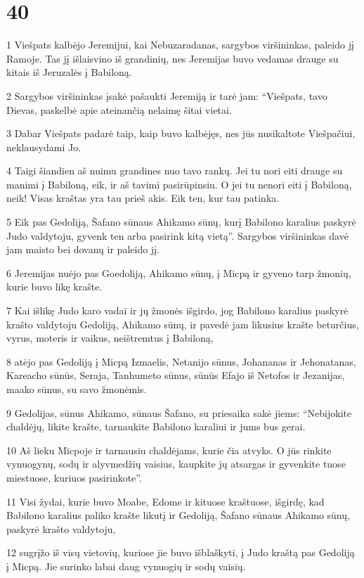 \chapter{40}


\par 1 Viešpats kalbėjo Jeremijui, kai Nebuzaradanas, sargybos viršininkas, paleido jį Ramoje. Tas jį išlaisvino iš grandinių, nes Jeremijas buvo vedamas drauge su kitais iš Jeruzalės į Babiloną. 
\par 2 Sargybos viršininkas įsakė pašaukti Jeremiją ir tarė jam: “Viešpats, tavo Dievas, paskelbė apie ateinančią nelaimę šitai vietai. 
\par 3 Dabar Viešpats padarė taip, kaip buvo kalbėjęs, nes jūs nusikaltote Viešpačiui, neklausydami Jo. 
\par 4 Taigi šiandien aš nuimu grandines nuo tavo rankų. Jei tu nori eiti drauge su manimi į Babiloną, eik, ir aš tavimi pasirūpinsiu. O jei tu nenori eiti į Babiloną, neik! Visas kraštas yra tau prieš akis. Eik ten, kur tau patinka. 
\par 5 Eik pas Gedoliją, Šafano sūnaus Ahikamo sūnų, kurį Babilono karalius paskyrė Judo valdytoju, gyvenk ten arba pasirink kitą vietą”. Sargybos viršininkas davė jam maisto bei dovanų ir paleido jį. 
\par 6 Jeremijas nuėjo pas Goedoliją, Ahikamo sūnų, į Micpą ir gyveno tarp žmonių, kurie buvo likę krašte. 
\par 7 Kai išlikę Judo karo vadai ir jų žmonės išgirdo, jog Babilono karalius paskyrė krašto valdytoju Gedoliją, Ahikamo sūnų, ir pavedė jam likusius krašte beturčius, vyrus, moteris ir vaikus, neištremtus į Babiloną, 
\par 8 atėjo pas Gedoliją į Micpą Izmaelis, Netanijo sūnus, Johananas ir Jehonatanas, Kareacho sūnūs, Seraja, Tanhumeto sūnus, sūnūs Efajo iš Netofos ir Jezanijas, maako sūnus, su savo žmonėmis. 
\par 9 Gedolijas, sūnus Ahikamo, sūnaus Šafano, su priesaika sakė jiems: “Nebijokite chaldėjų, likite krašte, tarnaukite Babilono karaliui ir jums bus gerai. 
\par 10 Aš lieku Micpoje ir tarnausiu chaldėjams, kurie čia atvyks. O jūs rinkite vynuogynų, sodų ir alyvmedžių vaisius, kaupkite jų atsargas ir gyvenkite tuose miestuose, kuriuos pasirinkote”. 
\par 11 Visi žydai, kurie buvo Moabe, Edome ir kituose kraštuose, išgirdę, kad Babilono karalius paliko krašte likutį ir Gedoliją, Šafano sūnaus Ahikamo sūnų, paskyrė krašto valdytoju, 
\par 12 sugrįžo iš visų vietovių, kuriose jie buvo išblaškyti, į Judo kraštą pas Gedoliją į Micpą. Jie surinko labai daug vynuogių ir sodų vaisių. 
